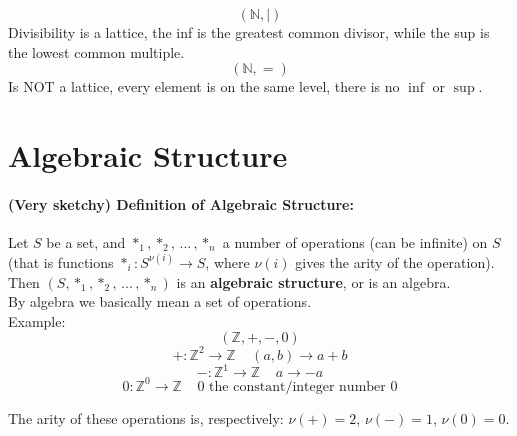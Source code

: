 	$$ (\mathbb{N}, |) $$
	Divisibility is a lattice, the inf is the greatest common divisor, while the sup is the lowest common multiple.\\

	$$ (\mathbb{N}, =) $$
	Is NOT a lattice, every element is on the same level, there is no $\inf$ or $\sup$.\\


%
%
%
%
%
%

	\newpage

	\section{Algebraic Structure}


	\paragraph{(Very sketchy) Definition of Algebraic Structure:} Let $S$ be a set, and $\ast_1, \ast_2, \, ... \, , \ast_n$ a number of operations (can be infinite) on $S$ (that is functions $\ast_i : S^{\nu(i)} \rightarrow S$, where $\nu(i)$ gives the arity of the operation).\\

	Then $(S, \ast_1, \ast_2, \, ... \, , \ast_n)$ is an \textbf{algebraic structure}, or is an algebra. \\

	By algebra we basically mean a set of operations.\\

	Example:
	$$ (\mathbb{Z}, +, -, 0) $$
	$$ + : \mathbb{Z}^2 \rightarrow \mathbb{Z} \;\;\;\; (a,b) \rightarrow a + b $$
	$$ - : \mathbb{Z}^1 \rightarrow \mathbb{Z} \;\;\;\; a \rightarrow - a $$
	$$ 0 : \mathbb{Z}^0 \rightarrow \mathbb{Z} \;\;\;\; 0 \text{ the constant/integer number } 0 $$

	The arity of these operations is, respectively: $\nu(+) = 2$, $\nu(-) = 1$, $\nu(0) = 0$.\\

